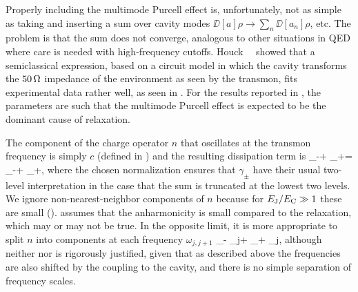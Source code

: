 Properly including the multimode Purcell effect is, unfortunately, not as simple as taking  and inserting a sum over cavity modes $\DD[a]\rho\to\sum_n \DD[a_n]\rho$, etc. The problem is that the sum does not converge, analogous to other situations in QED where care is needed with high-frequency cutoffs. Houck~\etal\ \cite{houck_controlling_2008} showed that a semiclassical expression, based on a circuit model in which the cavity transforms the $50\,\text{\textohm}$ impedance of the environment as seen by the transmon, fits experimental data rather well, as seen in . For the results reported in , the parameters are such that the multimode Purcell effect is expected to be the dominant cause of relaxation.

The component of the charge operator $n$ that oscillates at the transmon frequency is simply $c$ (defined in ) and the resulting dissipation term is
\be
    \label{eq:translax1}
    \gamma_-\DD[c]\rho + \gamma_+\DD[c\dg]\rho =
        \gamma_-\DD{}\rho +
        \gamma_+\DD{}\rho ,
\ee
where the chosen normalization ensures that $\gamma_\pm$ have their usual two-level interpretation in the case that the sum is truncated at the lowest two levels. We ignore non-nearest-neighbor components of $n$  because for $E_{\text{J}}/E_{\text{C}}\gg1$ these are small ().  assumes that the anharmonicity is small compared to the relaxation, which may or may not be true. In the opposite limit, it is more appropriate to split $n$ into components at each frequency $\omega_{j,j+1}$
\be
    \label{eq:translax2}
      \gamma_- \sum_j\DD{}\rho +
      \gamma_+ \sum_j\DD{}\rho ,
\ee
although neither  nor  is rigorously justified, given that as described above the frequencies are also shifted by the coupling to the cavity, and there is no simple separation of frequency scales.

